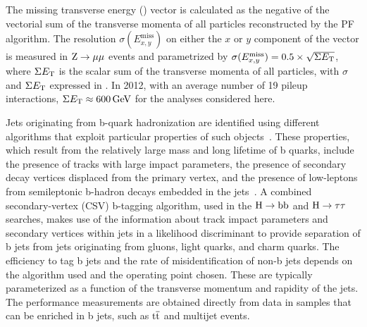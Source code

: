 \documentclass[12pt,twoside,a4paper,cmspaper,final,collab]{cms-tdr}
\begin{document}
The missing transverse energy (\MET)  vector is calculated as the negative of the vectorial sum of the transverse momenta of all particles reconstructed by the PF algorithm.
The resolution $\sigma(E_{x,y}^{\text{miss}})$ on either the $x$ or $y$ component of the \MET vector is measured in $\mathrm{Z}\to\mu\mu$ events
and parametrized by $\sigma(E_{x,y}^{\text{miss}})=0.5\times\sqrt{{\Sigma {\ensuremath{E_{\mathrm{T}}}}}}$,
where $\Sigma {\ensuremath{E_{\mathrm{T}}}}$ is the scalar sum of the transverse momenta of all particles, with
$\sigma$ and $\Sigma {\ensuremath{E_{\mathrm{T}}}}$ expressed in \GeVns{}.
In 2012, with an average number of 19 pileup interactions, $\Sigma {\ensuremath{E_{\mathrm{T}}}}\approx 600\,\text{Ge\hspace{-.08em}V}$ for the analyses considered here.

Jets originating from b-quark hadronization are identified using different algorithms that exploit
 particular properties of such objects~\cite{CMS-PAS-BTV-12-001}.
These properties, which result from the relatively large mass and long lifetime of b quarks,
include the presence of tracks with large impact parameters, the presence of secondary decay vertices displaced from
the primary vertex, and the
 presence of low-\PT leptons from semileptonic b-hadron decays
 embedded in the jets~\cite{CMS-PAS-BTV-12-001}.
A combined secondary-vertex (CSV) b-tagging algorithm, used in the $\mathrm{H}\to\mathrm{b}\mathrm{b}$ and $\mathrm{H}\to\tau\tau$ searches,
makes use of the information about track impact parameters and secondary vertices within jets in a likelihood discriminant to provide separation
of b jets from jets originating from gluons, light quarks, and charm quarks.
The efficiency to tag b jets and the rate of misidentification of non-b jets depends on the algorithm used and the
operating point chosen. These are typically parameterized as a function of the transverse momentum and rapidity of the jets.
The performance measurements are obtained directly from data in samples that can be enriched in b jets,
such as $\mathrm{t}\overline{\mathrm{t}}$ and multijet events.
\end{document}
